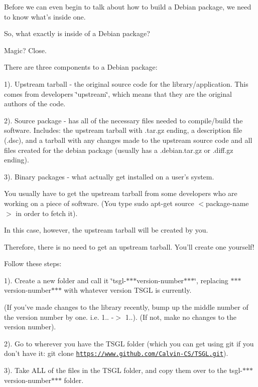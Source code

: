 Before we can even begin to talk about how to build a Debian package, we need to know what's inside one.

So, what exactly is inside of a Debian package?

Magic? Close.

There are three components to a Debian package\-:

1). Upstream tarball -\/ the original source code for the library/application. This comes from developers \char`\"{}upstream\char`\"{}, which means that they are the original authors of the code.

2). Source package -\/ has all of the necessary files needed to compile/build the software. Includes\-: the upstream tarball with .tar.\-gz ending, a description file (.dsc), and a tarball with any changes made to the upstream source code and all files created for the debian package (usually has a .debian.\-tar.\-gz or .diff.\-gz ending).

3). Binary packages -\/ what actually get installed on a user's system.

You usually have to get the upstream tarball from some developers who are working on a piece of software. (You type {\ttfamily sudo apt-\/get source $<$package-\/name$>$} in order to fetch it).

In this case, however, the upstream tarball will be created by you.

Therefore, there is no need to get an upstream tarball. You'll create one yourself!

Follow these steps\-:

1). Create a new folder and call it \char`\"{}tsgl-\/$\ast$$\ast$$\ast$version-\/number$\ast$$\ast$$\ast$\char`\"{}, replacing $\ast$$\ast$$\ast$version-\/number$\ast$$\ast$$\ast$ with whatever version T\-S\-G\-L is currently.

(If you've made changes to the library recently, bump up the middle number of the version number by one. i.\-e. 1.. -\/$>$ 1..). (If not, make no changes to the version number).

2). Go to wherever you have the T\-S\-G\-L folder (which you can get using git if you don't have it\-: git clone \href{https://www.github.com/Calvin-CS/TSGL.git}{\tt https\-://www.\-github.\-com/\-Calvin-\/\-C\-S/\-T\-S\-G\-L.\-git}).

3). Take A\-L\-L of the files in the T\-S\-G\-L folder, and copy them over to the tsgl-\/$\ast$$\ast$$\ast$version-\/number$\ast$$\ast$$\ast$ folder.

